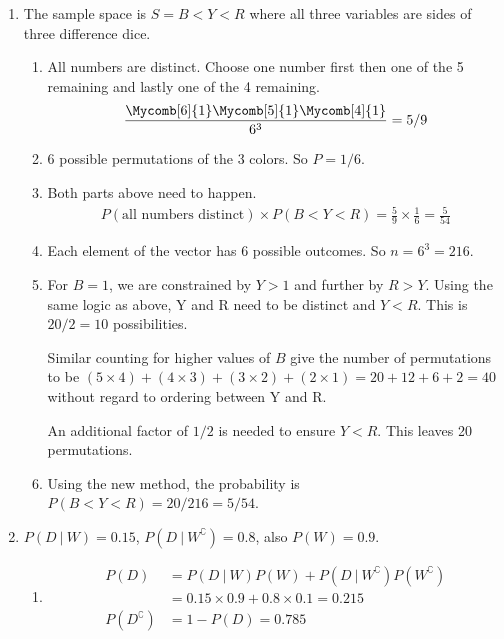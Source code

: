 \begin{enumerate}
	
	
	\item The sample space is $ S = {B<Y<R} $ where all three variables are sides of three difference dice.
	
		\begin{enumerate}
			
			\item All numbers are distinct. Choose one number first then one of the 5 remaining and lastly one of the 4 remaining.
			\begin{align}
				\frac{\Mycomb[6]{1} \Mycomb[5]{1} \Mycomb[4]{1}}{6^3} = 5/9
			\end{align}
			
			\item 6 possible permutations of the 3 colors. So $ P = 1/6 $.
			
			\item Both parts above need to happen.
			\begin{align}
				P(\text{all numbers distinct}) \times P(B<Y<R) = \frac{5}{9} \times \frac{1}{6} = \frac{5}{54}
			\end{align}
			
			\item Each element of the vector has 6 possible outcomes. So $ n = 6^3 = 216 $.
			
			\item For $ B = 1 $, we are constrained by $ Y > 1 $ and further by $ R > Y $. Using the same logic as above, Y and R need to be distinct and $ Y < R $. This is $ 20 / 2  = 10$ possibilities.
			
			Similar counting for higher values of $ B $ give the number of permutations to be $ (5 \times 4) + (4 \times 3) +
			(3 \times 2) + (2 \times 1)  = 20 + 12 +6 + 2 = 40 $ without regard to ordering between Y and R.
			
			An additional factor of $ 1/2 $ is needed to ensure $ Y < R $. This leaves 20 permutations.
			
			\item Using the new method, the probability is $ P(B < Y <R) =  20 / 216 = 5 / 54$.
		\end{enumerate}
	
	
	\item $ P(D\ |\ W) = 0.15 $, $ P(D\ |\ W^\complement) = 0.8 $, also $ P(W) = 0.9 $.
	\begin{enumerate}
		\item 
			\begin{align}
				P(D) &= P(D\ |\ W)P(W) + P(D\ |\ W^\complement)P(W^\complement) \\
				&= 0.15 \times 0.9 + 0.8 \times 0.1 = 0.215 \\
				P(D^\complement) &= 1 - P(D) = 0.785
			\end{align}
		

\end{enumerate}
\end{enumerate}
